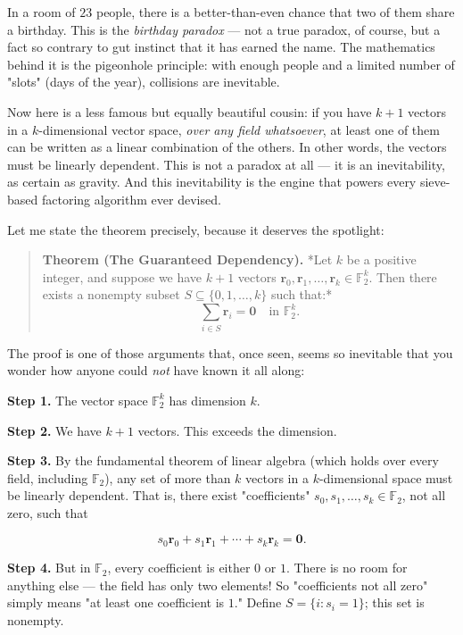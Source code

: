 In a room of $23$ people, there is a better-than-even chance that two of them share a birthday. This is the \textit{birthday paradox} --- not a true paradox, of course, but a fact so contrary to gut instinct that it has earned the name. The mathematics behind it is the pigeonhole principle: with enough people and a limited number of "slots" (days of the year), collisions are inevitable.

Now here is a less famous but equally beautiful cousin: if you have $k + 1$ vectors in a $k$-dimensional vector space, \textit{over any field whatsoever}, at least one of them can be written as a linear combination of the others. In other words, the vectors must be linearly dependent. This is not a paradox at all --- it is an inevitability, as certain as gravity. And this inevitability is the engine that powers every sieve-based factoring algorithm ever devised.

Let me state the theorem precisely, because it deserves the spotlight:

\begin{quote}
\textbf{Theorem (The Guaranteed Dependency).} *Let $k$ be a positive integer, and suppose we have $k + 1$ vectors $\mathbf{r}_0, \mathbf{r}_1, \ldots, \mathbf{r}_k \in \mathbb{F}_2^k$. Then there exists a nonempty subset $S \subseteq \{0, 1, \ldots, k\}$ such that:*
$$\sum_{i \in S} \mathbf{r}_i = \mathbf{0} \quad \text{in } \mathbb{F}_2^k.$$
\end{quote}

The proof is one of those arguments that, once seen, seems so inevitable that you wonder how anyone could \textit{not} have known it all along:

\textbf{Step 1.} The vector space $\mathbb{F}_2^k$ has dimension $k$.

\textbf{Step 2.} We have $k + 1$ vectors. This exceeds the dimension.

\textbf{Step 3.} By the fundamental theorem of linear algebra (which holds over every field, including $\mathbb{F}_2$), any set of more than $k$ vectors in a $k$-dimensional space must be linearly dependent. That is, there exist "coefficients" $s_0, s_1, \ldots, s_k \in \mathbb{F}_2$, not all zero, such that

\[
s_0 \mathbf{r}_0 + s_1 \mathbf{r}_1 + \cdots + s_k \mathbf{r}_k = \mathbf{0}.
\]

\textbf{Step 4.} But in $\mathbb{F}_2$, every coefficient is either $0$ or $1$. There is no room for anything else --- the field has only two elements! So "coefficients not all zero" simply means "at least one coefficient is $1$." Define $S = \{i : s_i = 1\}$; this set is nonempty.

